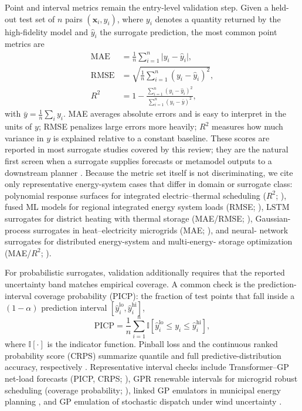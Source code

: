 Point and interval metrics remain the entry-level validation step.
Given a held-out test set of $n$ pairs $(\mathbf{x}_i, y_i)$, where
$y_i$ denotes a quantity returned by the high-fidelity model and
$\hat{y}_i$ the surrogate prediction, the most common point metrics are
\begin{align}
  \mathrm{MAE}  &= \frac{1}{n}\sum_{i=1}^{n}\lvert y_i - \hat{y}_i\rvert,
  \label{eq:mae} \\
  \mathrm{RMSE} &= \sqrt{\frac{1}{n}\sum_{i=1}^{n}(y_i - \hat{y}_i)^2},
  \label{eq:rmse} \\
  R^{2}         &= 1 - \frac{\sum_{i=1}^{n}(y_i - \hat{y}_i)^2}
                       {\sum_{i=1}^{n}(y_i - \bar{y})^2},
  \label{eq:r2}
\end{align}
with $\bar{y} = \frac{1}{n}\sum_i y_i$.
MAE averages absolute errors and is easy to interpret in the units of
$y$; RMSE penalizes large errors more heavily; $R^{2}$ measures how
much variance in $y$ is explained relative to a constant baseline.
These scores are reported in most surrogate studies covered by this
review; they are the natural first screen when a surrogate supplies
forecasts or metamodel outputs to a downstream planner
\cite{Ruan2021221,Khaloie2025,Lim2025}.
Because the metric set itself is not discriminating, we cite only
representative energy-system cases that differ in domain or surrogate
class: polynomial response surfaces for integrated electric--thermal
scheduling ($R^{2}$; \cite{Wang2020202933}), fused ML models for
regional integrated energy system loads (RMSE;
\cite{Shi2024__2}), LSTM surrogates for district heating with thermal
storage (MAE/RMSE; \cite{Du2025}), Gaussian-process surrogates in
heat--electricity microgrids (MAE; \cite{Li2023__3}), and neural-
network surrogates for distributed energy-system and multi-energy-
storage optimization (MAE/$R^{2}$; \cite{Perera2019191,Ren2024}).

For probabilistic surrogates, validation additionally requires that the
reported uncertainty band matches empirical coverage.
A common check is the prediction-interval coverage probability
(PICP): the fraction of test points that fall inside a
$(1-\alpha)$ prediction interval $[\hat{y}_i^{\mathrm{lo}},
\hat{y}_i^{\mathrm{hi}}]$,
\begin{equation}
  \mathrm{PICP} = \frac{1}{n}\sum_{i=1}^{n}
  \mathbb{I}\!\left[\hat{y}_i^{\mathrm{lo}} \le y_i \le
  \hat{y}_i^{\mathrm{hi}}\right],
  \label{eq:picp}
\end{equation}
where $\mathbb{I}[\cdot]$ is the indicator function.
Pinball loss and the continuous ranked probability score (CRPS)
summarize quantile and full predictive-distribution accuracy,
respectively \cite{Hu2024,Sun20191497}.
Representative interval checks include Transformer--GP net-load
forecasts (PICP, CRPS; \cite{Hu2024}), GPR renewable intervals for
microgrid robust scheduling (coverage probability; \cite{Yang2024__2}),
linked GP emulators in municipal energy planning
\cite{Volodina2022,Lawson201647}, and GP emulation of stochastic
dispatch under wind uncertainty \cite{Hu2020,Hu2021671}.

